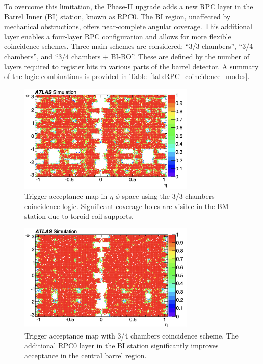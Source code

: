 To overcome this limitation, the Phase-II upgrade adds a new RPC layer in the Barrel Inner (BI) station, known as RPC0. The BI region, unaffected by mechanical obstructions, offers near-complete angular coverage. This additional layer enables a four-layer RPC configuration and allows for more flexible coincidence schemes. Three main schemes are considered: “3/3 chambers”, “3/4 chambers”, and “3/4 chambers + BI-BO”. These are defined by the number of layers required to register hits in various parts of the barrel detector. A summary of the logic combinations is provided in Table~\ref{tab:RPC_coincidence_modes}.



\begin{figure}[htbp]
  \centering
  \includegraphics[width=0.75\textwidth]{figs/chapter4/trigger_acceptance_map_3_3.png}
  \caption{Trigger acceptance map in $\eta$-$\phi$ space using the 3/3 chambers coincidence logic. Significant coverage holes are visible in the BM station due to toroid coil supports.}
  \label{fig:trigger_acceptance_3_3}
\end{figure}

\begin{figure}[htbp]
  \centering
  \includegraphics[width=0.75\textwidth]{figs/chapter4/trigger_acceptance_map_3_4.png}
  \caption{Trigger acceptance map with 3/4 chambers coincidence scheme. The additional RPC0 layer in the BI station significantly improves acceptance in the central barrel region.}
  \label{fig:trigger_acceptance_3_4}
\end{figure}

